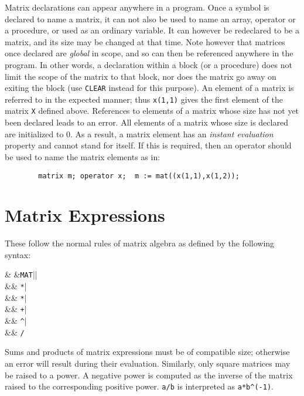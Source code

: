 Matrix declarations can appear anywhere in a program. Once a symbol is
declared to name a matrix, it can not also be used to name an array,
operator or a procedure, or used as an ordinary variable. It can however
be redeclared to be a matrix, and its size may be changed at that time.
Note however that matrices once declared are \emph{global} in scope, and so
can then be referenced anywhere in the program.  In other words, a
declaration within a block (or a procedure) does not limit the scope of
the matrix to that block, nor does the matrix go away on exiting the block
(use \texttt{CLEAR} instead for this purpose).  An element of a matrix is
referred to in the expected manner; thus \texttt{x(1,1)} gives the first
element of the matrix \texttt{X} defined above.  References to elements of a
matrix whose size has not yet been declared leads to an error.  All
elements of a matrix whose size is declared are initialized to 0.  As a
result, a matrix element has an \emph{instant evaluation} property and cannot stand for itself.  If this is required,
then an operator should be used to name the matrix elements as in:
\begin{verbatim}
        matrix m; operator x;  m := mat((x(1,1),x(1,2));
\end{verbatim}

\section{Matrix Expressions}
\label{sec:core-matrix-expressions}

These follow the normal rules of matrix algebra as defined by the
following syntax:
\begin{syntaxtable}
     & \BNFprod &\texttt{MAT}|| \\
      &&       \texttt{*}| \\
      &&       \texttt{*}| \\
      &&       \texttt{+}| \\
      &&       \texttt{\textasciicircum}| \\
      &&       \texttt{/}
\end{syntaxtable}
Sums and products of matrix expressions must be of compatible size;
otherwise an error will result during their evaluation.  Similarly, only
square matrices may be raised to a power.  A negative power is computed as
the inverse of the matrix raised to the corresponding positive power.
\texttt{a/b} is interpreted as \texttt{a*b\textasciicircum (-1)}.

